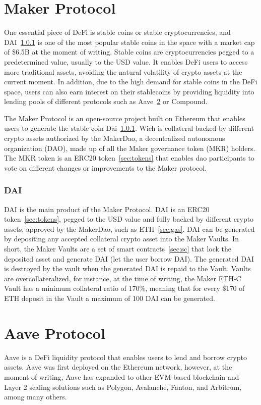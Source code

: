 \documentclass[11pt,a4paper]{report}
\begin{document}
\section{Maker Protocol}\label{sec:maker}
One essential piece of DeFi is stable coins or stable cryptocurrencies, and DAI~\ref{sec:dai}  is one of the most popular stable coins in the space with a market cap of \$6.5B\cite{stablecoinsmarket} at the moment of writing. Stable coins are cryptocurrencies pegged to a predetermined value, usually to the USD value. It enables DeFi users to access more traditional assets, avoiding the natural volatility of crypto assets at the current moment. In addition, due to the high demand for stable coins in the DeFi space, users can also earn interest on their stablecoins by providing liquidity into lending pools of different protocols such as Aave~\ref{sec:aave} or Compound\cite{compound}.

The Maker Protocol\cite{maker} is an open-source project built on Ethereum that enables users to generate the stable coin Dai~\ref{sec:dai}. Wich is collateral backed by different crypto assets authorized by the MakerDao, a decentralized autonomous organization (DAO)\cite{wiki:Dao}, made up of all the Maker governance token (MKR) holders. The MKR token is an ERC20 token~\ref{sec:tokens} that enables dao participants to vote on different changes or improvements to the Maker protocol.


\subsubsection{DAI}\label{sec:dai}
DAI\cite{makerDAI} is the main product of the Maker Protocol. DAI is an ERC20 token~\ref{sec:tokens},  pegged to the USD value and fully backed by different crypto assets, approved by the MakerDao, such as ETH~\ref{sec:gas}. DAI can be generated by depositing any accepted collateral crypto asset into the Maker Vaults. In short, the Maker Vaults are a set of smart contracts~\ref{sec:sc} that lock the deposited asset and generate DAI (let the user borrow DAI). The generated DAI is destroyed by the vault when the generated DAI is repaid to the Vault. Vaults are overcollateralized, for instance, at the time of writing, the Maker ETH-C Vault has a minimum collateral ratio of 170\%\cite{oasisapp}, meaning that for every \$170 of ETH deposit in the Vault a maximum of 100 DAI can be generated.

\section{Aave Protocol}\label{sec:aave}
Aave\cite{aaveV1}\cite{aaveV2}\cite{aaveV3} is a DeFi liquidity protocol that enables users to lend and borrow crypto assets. Aave was first deployed on the Ethereum network, however, at the moment of writing, Aave has expanded to other EVM-based blockchain and Layer 2 scaling solutions such as  Polygon\cite{polygon}, Avalanche\cite{avax}, Fanton\cite{fanton}, and Arbitrum\cite{arbitrum}, among many others.
\end{document}
